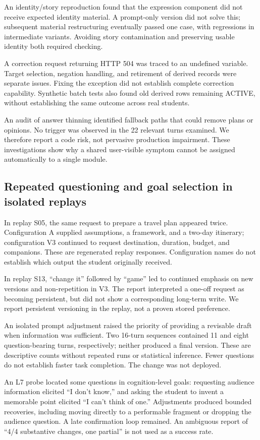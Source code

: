 \documentclass[11pt,a4paper]{article}
\begin{document}
An identity/story reproduction found that the expression component did not receive expected identity material. A prompt-only version did not solve this; subsequent material restructuring eventually passed one case, with regressions in intermediate variants. Avoiding story contamination and preserving usable identity both required checking.

A correction request returning HTTP 504 was traced to an undefined variable. Target selection, negation handling, and retirement of derived records were separate issues. Fixing the exception did not establish complete correction capability. Synthetic batch tests also found old derived rows remaining ACTIVE, without establishing the same outcome across real students.

An audit of answer thinning identified fallback paths that could remove plans or opinions. No trigger was observed in the 22 relevant turns examined. We therefore report a code risk, not pervasive production impairment. These investigations show why a shared user-visible symptom cannot be assigned automatically to a single module.

\subsection{Repeated questioning and goal selection in isolated replays}
In replay S05, the same request to prepare a travel plan appeared twice. Configuration A supplied assumptions, a framework, and a two-day itinerary; configuration V3 continued to request destination, duration, budget, and companions. These are regenerated replay responses. Configuration names do not establish which output the student originally received.

In replay S13, ``change it'' followed by ``game'' led to continued emphasis on new versions and non-repetition in V3. The report interpreted a one-off request as becoming persistent, but did not show a corresponding long-term write. We report persistent versioning in the replay, not a proven stored preference.

An isolated prompt adjustment raised the priority of providing a revisable draft when information was sufficient. Two 16-turn sequences contained 11 and eight question-bearing turns, respectively; neither produced a final version. These are descriptive counts without repeated runs or statistical inference. Fewer questions do not establish faster task completion. The change was not deployed.

An L7 probe located some questions in cognition-level goals: requesting audience information elicited ``I don't know,'' and asking the student to invent a memorable point elicited ``I can't think of one.'' Adjustments produced bounded recoveries, including moving directly to a performable fragment or dropping the audience question. A late confirmation loop remained. An ambiguous report of ``4/4 substantive changes, one partial'' is not used as a success rate.
\end{document}
